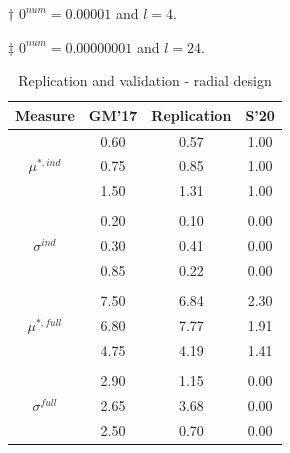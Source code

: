 \documentclass[a4paper,12pt]{article}
\begin{document}
\begin{table}[H]
\begin{threeparttable}
\begin{tablenotes}
	\item[$\dagger$] \footnotesize $0^{num}=0.00001$ and $l=4$. 
    \item[$\ddagger$] $0^{num}=0.00000001$ and $l=24$.\par

\end{tablenotes}
\end{threeparttable}
\end{table}

\hspace{1cm} %
\setlength{\tabcolsep}{12pt} %
\begin{table}[H]
	\centering
	\caption{Replication and validation - radial design}
	\label{tab:repval2}
	\renewcommand{\arraystretch}{1.2}%
	\begin{tabular}{cS[table-format=3.2]S[table-format=3.2]S[table-format=3.2]}
		\toprule
		{Measure}     & {GM'17}   & {Replication}  & {S'20} \\ 
		\midrule
		
		& 0.60  & 0.57         &  1.00 \\
		\qquad $\mu^{*,ind}$                               & 0.75  & 0.85         &  1.00 \\
		& 1.50  & 1.31         &  1.00 \\
		&&& \\
		& 0.20   & 0.10         &  0.00 \\
		\qquad $\sigma^{ind}$                            & 0.30   & 0.41         &  0.00 \\
		& 0.85  & 0.22         & 0.00 \\
		&&& \\
		& 7.50  & 6.84         &  2.30 \\
		\qquad $\mu^{*,full}$                              & 6.80   & 7.77         &  1.91 \\
		& 4.75  & 4.19         &  1.41 \\
		&&& \\
		& 2.90  & 1.15         &  0.00 \\
		\qquad $\sigma^{full}$                           & 2.65  & 3.68         &  0.00 \\
		& 2.50   & 0.70         &  0.00 \\ \bottomrule
	\end{tabular}
\end{table}
\end{document}
